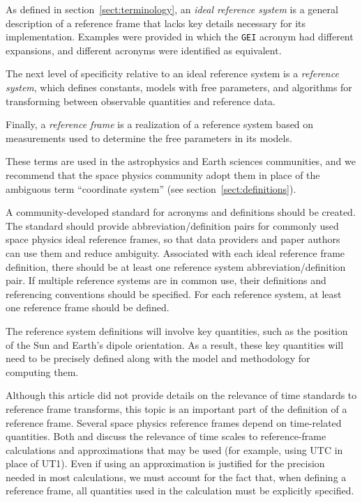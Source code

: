 \documentclass[draft]{agujournal2019}
\begin{document}
As defined in section~\ref {sect:terminology}, an {\it ideal reference system} is a general description of a reference frame that lacks key details necessary for its implementation. Examples were provided in which the \texttt{GEI} acronym had different expansions, and different acronyms were identified as equivalent.
  
The next level of specificity relative to an ideal reference system is a {\it reference system}, which defines constants, models with free parameters, and algorithms for transforming between observable quantities and reference data. 

Finally, a {\it reference frame} is a realization of a reference system based on measurements used to determine the free parameters in its models. 

These terms are used in the astrophysics and Earth sciences communities, and we recommend that the space physics community adopt them in place of the ambiguous term ``coordinate system'' (see section~\ref{sect:definitions}).

A community-developed standard for acronyms and definitions should be created. The standard should provide abbreviation/definition pairs for commonly used space physics ideal reference frames, so that data providers and paper authors can use them and reduce ambiguity. Associated with each ideal reference frame definition, there should be at least one reference system abbreviation/definition pair. If multiple reference systems are in common use, their definitions and referencing conventions should be specified. For each reference system, at least one reference frame should be defined.

The reference system definitions will involve key quantities, such as the position of the Sun and Earth's dipole orientation. As a result, these key quantities will need to be precisely defined along with the model and methodology for computing them. 

Although this article did not provide details on the relevance of time standards to reference frame transforms, this topic is an important part of the definition of a reference frame. Several space physics reference frames depend on time-related quantities. Both  and  discuss the relevance of time scales to reference-frame calculations and approximations that may be used (for example, using UTC in place of UT1). Even if using an approximation is justified for the precision needed in most calculations, we must account for the fact that, when defining a reference frame, all quantities used in the calculation must be explicitly specified. 
\end{document}
